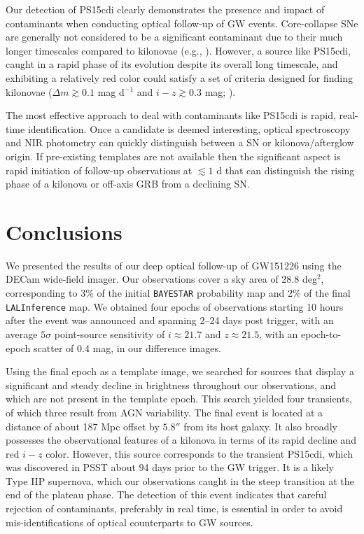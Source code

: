 Our detection of PS15cdi clearly demonstrates the presence and impact
of contaminants when conducting optical follow-up of GW events.
Core-collapse SNe are generally not considered to be a
significant contaminant due to their much longer timescales compared
to kilonovae (e.g., \citealt{CowpBerger15}). However, a
source like PS15cdi, caught in a rapid phase of its evolution
despite its overall long timescale, and
exhibiting a relatively red color could
satisfy a set of criteria designed for finding kilonovae ($\Delta m\gtrsim
0.1$ mag d$^{-1}$ and $i-z\gtrsim 0.3$ mag; \citealt{CowpBerger15}).

The most effective approach to deal with contaminants like PS15cdi is rapid,
real-time identification. Once a candidate is deemed interesting, optical spectroscopy and
NIR photometry can quickly distinguish between a SN or kilonova/afterglow
origin. If pre-existing templates are not available then the significant aspect is rapid initiation of
follow-up observations at $\lesssim 1$ d that can distinguish the rising phase of a kilonova or
off-axis GRB from a declining SN.

\section{Conclusions}
\label{sec:ch4_conc}
We presented the results of our deep optical follow-up of
GW151226 using the DECam wide-field
imager. Our observations cover a sky area of 28.8 deg$^2$,
corresponding to $3\%$ of the initial {\tt BAYESTAR} probability map
and 2\% of the final {\tt LALInference} map. We obtained
four epochs of observations starting 10 hours after the
event was announced and spanning 2--24 days post
trigger, with an average $5\sigma$ point-source sensitivity of
$i\approx21.7$ and $z\approx21.5$, with an epoch-to-epoch scatter
of 0.4 mag, in our difference images.

Using the final epoch as a template image, we searched for sources
that display a significant and steady decline in brightness
throughout our observations, and which are not present in the template
epoch. This search yielded four transients, of which three result from
 AGN variability. The final event is located at a distance of about
187 Mpc offset by $5.8''$ from its host galaxy. It also broadly possesses the
observational features of a kilonova in terms of its rapid decline and
red $i-z$ color. However, this source corresponds to the transient
PS15cdi, which was discovered in PSST about 94 days prior to the GW
trigger. It is a likely Type IIP supernova, which our observations
caught in the steep transition at the end of the plateau phase. The
detection of this event indicates that careful rejection of
contaminants, preferably in real time, is essential in order to avoid
mis-identifications of optical counterparts to GW sources.


